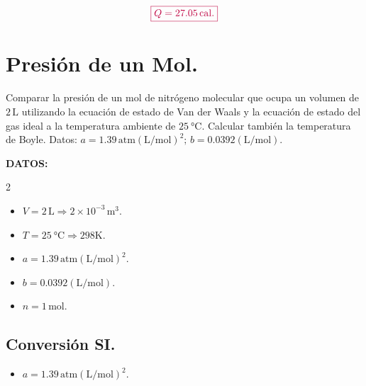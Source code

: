 \documentclass[a4paper,12pt]{article} %
\begin{document}
\vspace{\baselineskip}

\[ \textcolor{purple}{\boxed{ Q = 27.05 \, \mathrm{cal}. }} \]

\section{Presión de un Mol.}

\begin{justify}
	Comparar la presión de un mol de nitrógeno molecular que ocupa un volumen de \( 2 \, \mathrm{L} \) utilizando la ecuación de estado de Van der Waals y la ecuación de estado del gas ideal a la temperatura ambiente de \( \SI{25}{\degreeCelsius} \). Calcular también la temperatura de Boyle. Datos: \( a = 1.39 \, \mathrm{atm} \left( \mathrm{L} / \mathrm{mol} \right)^2 ; \, b=0 .0392 \left( \mathrm{L} / \mathrm{mol} \right) . \)
\end{justify}

\begin{justify}
	\textbf{DATOS:}
\end{justify}

\begin{multicols}{2}
	\begin{itemize}
		\item \( V = 2 \, \mathrm{L} \Rightarrow 2 \times 10^{-3} \, \mathrm{m}^3. \)
		\item \( T = \SI{25}{\degreeCelsius} \Rightarrow 298 \mathrm{K}. \)
		\item \( a = 1.39 \, \mathrm{atm} \left( \mathrm{L} / \mathrm{mol} \right)^2. \)
		\item \( b = 0 .0392 \left( \mathrm{L} / \mathrm{mol} \right) . \)
	\end{itemize}
\end{multicols}

\begin{itemize}
	\item \(n = 1 \, \mathrm{mol}. \)
\end{itemize}

\subsection{Conversión SI.}

\vspace{\baselineskip}

\begin{itemize}
	\item \( a = 1.39 \, \mathrm{atm} \left( \mathrm{L} / \mathrm{mol} \right)^2. \)
\end{itemize}
\end{document}
